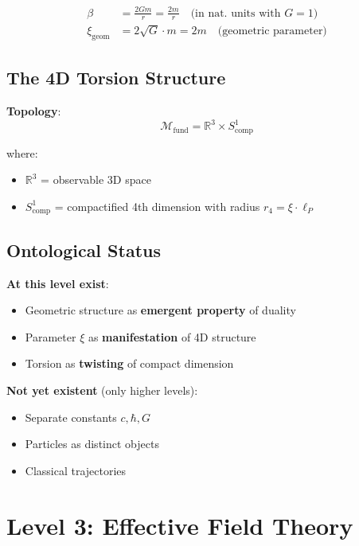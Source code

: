 	\begin{align}
		\beta &= \frac{2Gm}{r} = \frac{2m}{r} \quad \text{(in nat. units with } G=1\text{)} \\
		\xi_{\text{geom}} &= 2\sqrt{G} \cdot m = 2m \quad \text{(geometric parameter)}
	\end{align}
	
	\subsection{The 4D Torsion Structure}
	
	\textbf{Topology}:
	\begin{equation}
		\mathcal{M}_{\text{fund}} = \mathbb{R}^3 \times S^1_{\text{comp}}
	\end{equation}
	
	where:
	\begin{itemize}
		\item $\mathbb{R}^3$ = observable 3D space
		\item $S^1_{\text{comp}}$ = compactified 4th dimension with radius $r_4 = \xi \cdot \ell_P$
	\end{itemize}
	
	\subsection{Ontological Status}
	
	\textbf{At this level exist}:
	\begin{itemize}
		\item Geometric structure as \textbf{emergent property} of duality
		\item Parameter $\xi$ as \textbf{manifestation} of 4D structure
		\item Torsion as \textbf{twisting} of compact dimension
	\end{itemize}
	
	\textbf{Not yet existent} (only higher levels):
	\begin{itemize}
		\item Separate constants $c, \hbar, G$
		\item Particles as distinct objects
		\item Classical trajectories
	\end{itemize}
	
	\section{Level 3: Effective Field Theory}
	
